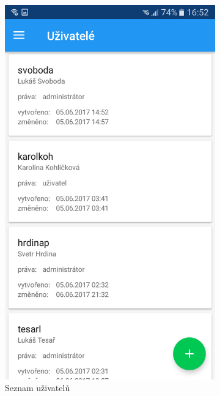 \documentclass[12pt]{report}
\begin{document}
\begin{figure}[H]
	\centering
  \begin{subfigure}[b]{0.3\textwidth}
	\centering
	\includegraphics[width=\textwidth]{../images/client_android/Screenshot_20170607-165248.png}	
	\caption{Seznam uživatelů}
	\label{fig:Screenshot_20170607-165248}
  \end{subfigure}
  \begin{subfigure}[b]{0.3\textwidth}
    \centering

\end{subfigure}
\end{figure}
\end{document}
